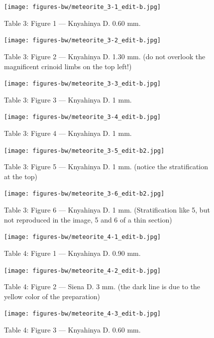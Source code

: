 \documentclass[a4paper, 12pt, oneside]{article}
\begin{document}
\clearpage
{}
\begin{figure}[t]
\texttt{[image: figures-bw/meteorite\_3-1\_edit-b.jpg]}
\caption{Table 3: Figure 1 --- Knyahinya D. 0.60 mm.}
\centering
\end{figure}
\clearpage
\begin{figure}[t]
\texttt{[image: figures-bw/meteorite\_3-2\_edit-b.jpg]}
\caption{Table 3: Figure 2 --- Knyahinya D. 1.30 mm. (do not overlook the magnificent crinoid limbs on the top left!)}
\centering
\end{figure}
\clearpage
\begin{figure}[t]
\texttt{[image: figures-bw/meteorite\_3-3\_edit-b.jpg]}
\caption{Table 3: Figure 3 --- Knyahinya D. 1 mm.}
\centering
\end{figure}
\clearpage
\begin{figure}[t]
\texttt{[image: figures-bw/meteorite\_3-4\_edit-b.jpg]}
\caption{Table 3: Figure 4 --- Knyahinya D. 1 mm.}
\centering
\end{figure}
\clearpage
\begin{figure}[t]
\texttt{[image: figures-bw/meteorite\_3-5\_edit-b2.jpg]}
\caption{Table 3: Figure 5 --- Knyahinya D. 1 mm. (notice the stratification at the top)}
\centering
\end{figure}
\clearpage
\begin{figure}[t]
\texttt{[image: figures-bw/meteorite\_3-6\_edit-b2.jpg]}
\caption{Table 3: Figure 6 --- Knyahinya D. 1 mm. (Stratification like 5, but not reproduced in the image, 5 and 6 of a thin section)}
\centering
\end{figure}
\clearpage
{}
\begin{figure}[t]
\texttt{[image: figures-bw/meteorite\_4-1\_edit-b.jpg]}
\caption{Table 4: Figure 1 --- Knyahinya D. 0.90 mm.}
\centering
\end{figure}
\clearpage
\begin{figure}[t]
\texttt{[image: figures-bw/meteorite\_4-2\_edit-b.jpg]}
\caption{Table 4: Figure 2 --- Siena D. 3 mm. (the dark line is due to the yellow color of the preparation)}
\centering
\end{figure}
\clearpage
\begin{figure}[t]
\texttt{[image: figures-bw/meteorite\_4-3\_edit-b.jpg]}
\caption{Table 4: Figure 3 --- Knyahinya D. 0.60 mm.}
\centering
\end{figure}
\end{document}
